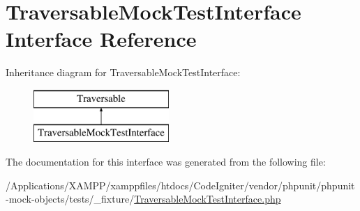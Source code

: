 \hypertarget{interface_traversable_mock_test_interface}{}\section{Traversable\+Mock\+Test\+Interface Interface Reference}
\label{interface_traversable_mock_test_interface}
Inheritance diagram for Traversable\+Mock\+Test\+Interface\+:\begin{figure}[H]
\begin{center}
\leavevmode
\includegraphics[height=2.000000cm]{interface_traversable_mock_test_interface}
\end{center}
\end{figure}


The documentation for this interface was generated from the following file\+:\begin{DoxyCompactItemize}
\item 
/\+Applications/\+X\+A\+M\+P\+P/xamppfiles/htdocs/\+Code\+Igniter/vendor/phpunit/phpunit-\/mock-\/objects/tests/\+\_\+fixture/\mbox{\hyperlink{_traversable_mock_test_interface_8php}{Traversable\+Mock\+Test\+Interface.\+php}}\end{DoxyCompactItemize}
